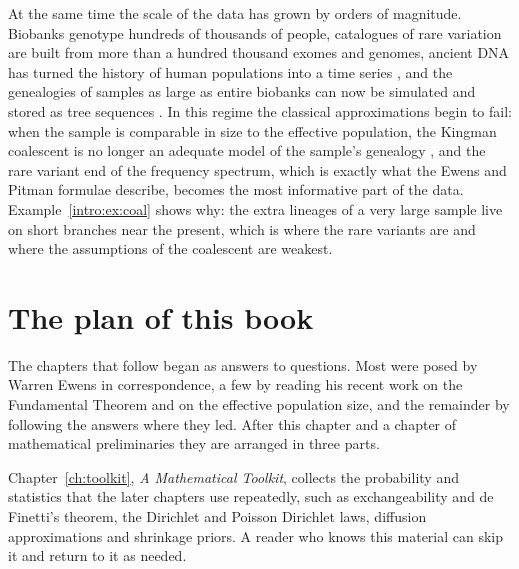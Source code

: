 At the same time the scale of the data has grown by orders of magnitude. Biobanks genotype
hundreds of thousands of people, catalogues of rare variation are built from more than a hundred
thousand exomes and genomes, ancient DNA has turned the history of human populations into a time
series \citep{intro:green2010}, and the genealogies of samples as large as entire biobanks can now be simulated and
stored as tree sequences \citep{intro:kelleher2016}. In this regime the classical approximations
begin to fail: when the sample is comparable in size to the effective population, the Kingman
coalescent is no longer an adequate model of the sample's genealogy
\citep{intro:wakeley2003,intro:bhaskar2014}, and the rare variant end of the frequency spectrum,
which is exactly what the Ewens and Pitman formulae describe, becomes the most informative part of
the data. Example~\ref{intro:ex:coal} shows why: the extra lineages of a very large sample live on
short branches near the present, which is where the rare variants are and where the assumptions of
the coalescent are weakest.

\section{The plan of this book}

The chapters that follow began as answers to questions. Most were posed by Warren Ewens in
correspondence, a few by reading his recent work on the Fundamental Theorem and on the effective
population size, and the remainder by following the answers where they led. After this chapter
and a chapter of mathematical preliminaries they are arranged in three parts.

Chapter~\ref{ch:toolkit}, \emph{A Mathematical Toolkit}, collects the probability and statistics
that the later chapters use repeatedly, such as exchangeability and de Finetti's theorem, the
Dirichlet and Poisson Dirichlet laws, diffusion approximations and shrinkage priors. A reader who knows this material can skip it and
return to it as needed.

